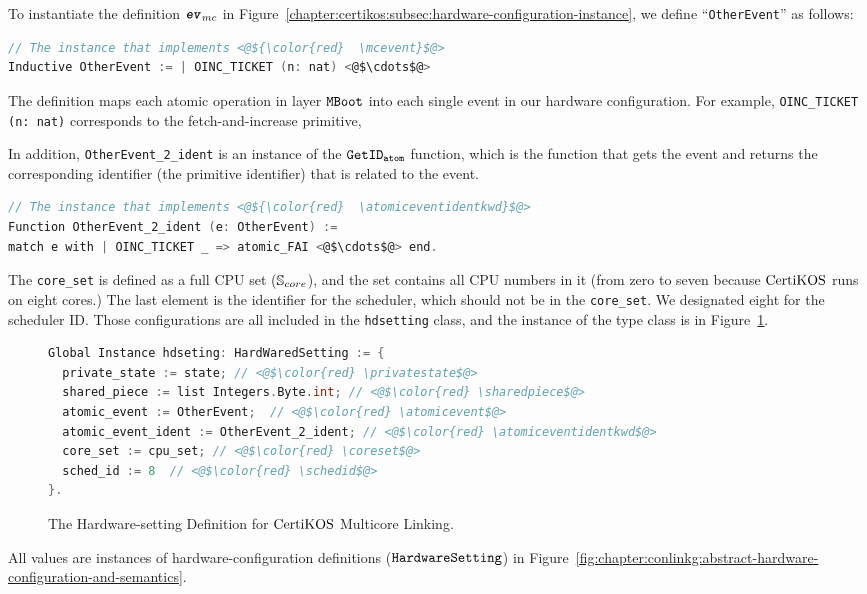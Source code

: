 To instantiate the definition ${{\mathrm{\texttt{\textbf{\textit{ev}}}}}_{mc}}$ in Figure~\ref{chapter:certikos:subsec:hardware-configuration-instance},
we define ``\lstinline$OtherEvent$'' as follows:
\begin{lstlisting}[language=C, deletekeywords={for}]
// The instance that implements <@${\color{red}  \mcevent}$@>
Inductive OtherEvent := | OINC_TICKET (n: nat) <@$\cdots$@> 
\end{lstlisting}
The definition maps each atomic operation in layer ${\mathrm{\texttt{MBoot}}}$ into each single event in our hardware configuration.
For example, \lstinline$OINC_TICKET (n: nat)$ corresponds to the fetch-and-increase primitive,

In addition, \lstinline$OtherEvent_2_ident$ is an instance of the ${{\mathrm{\texttt{GetID}}}_{{\mathrm{\texttt{atom}}}}}$ function, which is the function
that gets the event and returns the corresponding identifier (the primitive identifier) that is related to the event.
\begin{lstlisting}[language=C]
// The instance that implements <@${\color{red}  \atomiceventidentkwd}$@>
Function OtherEvent_2_ident (e: OtherEvent) := 
match e with | OINC_TICKET _ => atomic_FAI <@$\cdots$@> end.
\end{lstlisting}
The \lstinline$core_set$ is defined as a full CPU set (${\mathbb{S}_{core}}$), and 
the set contains all CPU numbers in it (from zero to seven because $\mathrm{CertiKOS}$ runs on eight cores.)
The last element is the identifier for 
the scheduler, which should not be in the \lstinline$core_set$. 
We designated eight for the scheduler ID.
Those configurations are all included in the 
\lstinline$hdsetting$ class, and the instance of the type class
is in Figure~\ref{fig:chapter:ceritkos:instances-of-abstract-hardware-setting}.
\begin{figure}
\begin{lstlisting}[language=C, deletekeywords={int}]
Global Instance hdseting: HardWaredSetting := {
  private_state := state; // <@$\color{red} \privatestate$@>
  shared_piece := list Integers.Byte.int; // <@$\color{red} \sharedpiece$@>
  atomic_event := OtherEvent;  // <@$\color{red} \atomicevent$@>
  atomic_event_ident := OtherEvent_2_ident; // <@$\color{red} \atomiceventidentkwd$@>
  core_set := cpu_set; // <@$\color{red} \coreset$@>
  sched_id := 8  // <@$\color{red} \schedid$@>
}.
\end{lstlisting}
\caption{The Hardware-setting Definition for $\mathrm{CertiKOS}$ Multicore Linking.}
\label{fig:chapter:ceritkos:instances-of-abstract-hardware-setting}
\end{figure}
All values are instances of 
hardware-configuration definitions (${\mathrm{\texttt{HardwareSetting}}}$) in Figure~\ref{fig:chapter:conlinkg:abstract-hardware-configuration-and-semantics}. 

